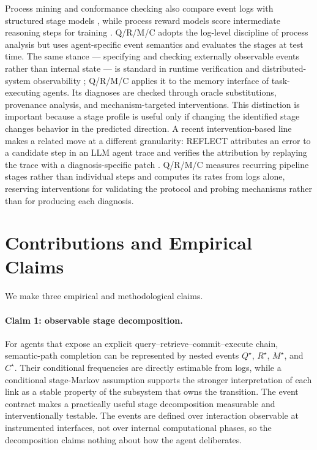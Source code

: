 \documentclass{article}
\begin{document}
Process mining and conformance checking also compare event logs with structured stage models \citep{vanderaalst2016process,carmona2018conformance}, while process reward models score intermediate reasoning steps for training \citep{lightman2024verify}. Q/R/M/C adopts the log-level discipline of process analysis but uses agent-specific event semantics and evaluates the stages at test time. The same stance --- specifying and checking externally observable events rather than internal state --- is standard in runtime verification and distributed-system observability \citep{leucker2009runtime}; Q/R/M/C applies it to the memory interface of task-executing agents. Its diagnoses are checked through oracle substitutions, provenance analysis, and mechanism-targeted interventions. This distinction is important because a stage profile is useful only if changing the identified stage changes behavior in the predicted direction. A recent intervention-based line makes a related move at a different granularity: REFLECT attributes an error to a candidate step in an LLM agent trace and verifies the attribution by replaying the trace with a diagnosis-specific patch \citep{lin2026reflect}. Q/R/M/C measures recurring pipeline stages rather than individual steps and computes its rates from logs alone, reserving interventions for validating the protocol and probing mechanisms rather than for producing each diagnosis.

\section{Contributions and Empirical Claims}
\label{sec:claims}

We make three empirical and methodological claims.

\paragraph{Claim 1: observable stage decomposition.}
For agents that expose an explicit query--retrieve--commit--execute chain, semantic-path completion can be represented by nested events $Q^\star$, $R^\star$, $M^\star$, and $C^\star$. Their conditional frequencies are directly estimable from logs, while a conditional stage-Markov assumption supports the stronger interpretation of each link as a stable property of the subsystem that owns the transition. The event contract makes a practically useful stage decomposition measurable and interventionally testable. The events are defined over interaction observable at instrumented interfaces, not over internal computational phases, so the decomposition claims nothing about how the agent deliberates.
\end{document}
